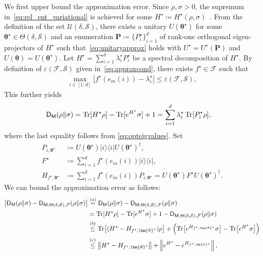 \documentclass[a4paper,onecolumn,11pt,accepted=2026-05-12]{quantumarticle}
\newcommand{\bra}[1]{\langle#1|}
\newcommand{\ket}[1]{|#1\rangle}
\newcommand{\norm}[1]{\left\Vert#1\right\Vert}
\newcommand{\abs}[1]{\left\vert#1\right\vert}
\newcommand{\sD}{\mathsf{D}}
\newcommand{\cF}{\mathcal{F}}
\newcommand{\cS}{\mathcal{S}}
\newcommand{\cU}{\mathcal{U}}
\begin{document}
We first upper bound the approximation error. Since $\rho,\sigma>0$, the supremum in~\eqref{eq:rel_ent_variational} is achieved for some $ H^{\star}\coloneqq  H^{\star}(\rho,\sigma)$~\cite{Berta2015OnEntropies}. From the definition of the set $\cU(\delta,\cS)$, there exists a unitary $U(\bm{\theta}^{\star})$ for some $\bm{\theta}^{\star} \in \Theta(\delta,\cS)$ and an enumeration $\mathbf{P}\coloneqq\{P_i^{\star}\}_{i=1}^d$ of rank-one orthogonal eigen-projectors of $ H^{\star}$ such that~\eqref{eq:unitaryapprox} holds with $U^{\star}=U^{\star}(\mathbf{P})$ and $U(\bm{\theta})=U(\bm{\theta}^{\star})$. 
 Let $H^{\star}=\sum_{i=1}^d \lambda_i^{\star}P_i^{\star}$ be a spectral decomposition of $H^{\star}$. 
 By definition of $ \varepsilon(\cF,\cS)$ given in~\eqref{eq:approxcond}, there exists $f^{\star} \in \cF$ such that
\begin{align}
    \max_{i \in [1:d]} \abs{f^{\star}(e_m(i))-\lambda_i^{\star}} \leq \varepsilon(\cF,\cS),\label{eq:apprcnn}
\end{align}
This further yields
\begin{align}
  & \sD_{\mathsf{M}}(\rho\Vert\sigma)= \operatorname{Tr}[H^{\star}\rho
]-\operatorname{Tr}[e^{H^{\star}}\sigma]+1 
= \sum_{i=1}^d \lambda_i^{\star} \operatorname{Tr}[P_i^{\star} \rho] ,\notag
\end{align}
where the last equality follows from \eqref{eq:opteigvalues}.
  Set 
\begin{subequations}\label{eq:paramhermop}
\begin{align}
P_{i,\bm{\theta}^{\star}}&\coloneqq U(\bm{\theta}^{\star})\ket{i}\!\bra{i}U(\bm{\theta}^{\star})^{\dag},\label{eq:projopt}\\
F^{\star} &\coloneqq \sum_{i=1}^d f^{\star}\!\left(e_m(i)\right) \ket{i}\!\bra{i}, \label{eq:nneigvals} \\
H_{f^{\star},\bm{\theta}^{\star}} &\coloneqq \sum_{i=1}^d f^{\star}\!\left(e_m(i)\right) P_{i,\bm{\theta}^{\star}}=U(\bm{\theta}^{\star})F^{\star} U(\bm{\theta}^{\star})^{\dag}. \label{eq:nnqcopt}
\end{align}   
\end{subequations}
We can bound the approximation error as follows: 
\begin{align}
    \abs{\sD_{\mathsf{M}}(\rho\Vert\sigma) -\sD_{\mathsf{M},\Theta(\delta,\cS),\cF}(\rho\Vert\sigma)}
   &\stackrel{(a)}{=}  \sD_{\mathsf{M}}(\rho\Vert\sigma) -\sD_{\mathsf{M},\Theta(\delta,\cS),\cF}(\rho\Vert\sigma) \notag\\
  &=\operatorname{Tr}[H^{\star}\rho
]-\operatorname{Tr}[e^{H^{\star}}\sigma]+1-\sD_{\mathsf{M},\Theta(\delta,\cS),\cF}(\rho\Vert\sigma) \notag\\
    & \stackrel{(b)}{\leq} \operatorname{Tr}\! \big[(H^{\star}-H_{f^{\star},\bm{\theta}^{\star}})\rho
\big]+\left(\operatorname{Tr}\!\big[e^{H_{f^{\star},\bm{\theta}^{\star}}}\sigma\big]-\operatorname{Tr}\!\big[e^{H^{\star}}\sigma\big]\right)\notag \\
& \stackrel{(c)}{\leq} \big\|H^{\star}-H_{f^{\star},\bm{\theta}^{\star}}\big\|+ \norm{e^{H^{\star}}-e^{H_{f^{\star},\bm{\theta}^{\star}}}}, \label{eq:euppbndefferr}
\end{align}
\end{document}
